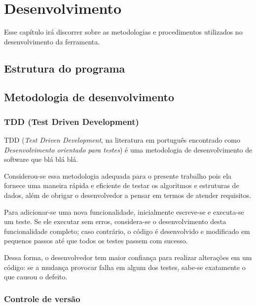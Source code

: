 \chapter{Desenvolvimento}

Esse capítulo irá discorrer sobre as metodologias e procedimentos utilizados no desenvolvimento da ferramenta.

\section{Estrutura do programa}
\section{Metodologia de desenvolvimento}
\subsection{TDD (Test Driven Development)}

TDD (\textit{Test Driven Development}, na literatura em português encontrado como \textit{Desenvolvimento orientado para testes}) é uma metodologia de desenvolvimento de software que blá blá blá.

Considerou-se essa metodologia adequada para o presente trabalho pois ela fornece uma maneira rápida e eficiente de testar os algoritmos e estruturas de dados, além de obrigar o desenvolvedor a pensar em termos de atender requisitos.

Para adicionar-se uma nova funcionalidade, inicialmente escreve-se e executa-se um teste. Se ele executar sem erros, considera-se o desenvolvimento desta funcionalidade completo; caso contrário, o código é desenvolvido e modificado em pequenos passos até que todos os testes passem com sucesso.

Dessa forma, o desenvolvedor tem maior confiança para realizar alterações em um código: se a mudança provocar falha em algum dos testes, sabe-se exatamente o que causou o defeito.
\subsection{Controle de versão}
